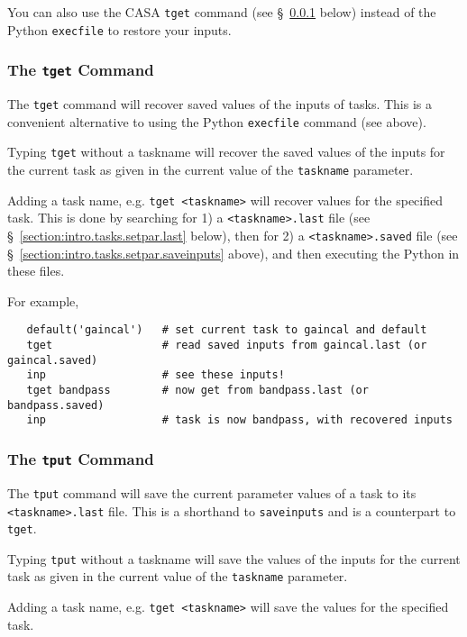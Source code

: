 You can also use the CASA {\tt tget} command (see
\S~\ref{section:intro.tasks.setpar.tget} below) instead of the Python
{\tt execfile} to restore your inputs.

\subsubsection{The {\tt tget} Command}
\label{section:intro.tasks.setpar.tget}

The {\tt tget} command will recover saved values of the
inputs of tasks.  This is a convenient alternative to using the
Python {\tt execfile} command (see above).

Typing {\tt tget} without a taskname will recover the saved values of the
inputs for the current task as given in the current value of the 
{\tt taskname} parameter.

Adding a task name, e.g. {\tt tget <taskname>} will recover
values for the specified task.  This is done by searching for
1) a {\tt <taskname>.last} file (see 
\S~\ref{section:intro.tasks.setpar.last} below), then for
2) a {\tt <taskname>.saved} file (see
\S~\ref{section:intro.tasks.setpar.saveinputs} above), and then
executing the Python in these files.

For example,
\small
\begin{verbatim}
   default('gaincal')   # set current task to gaincal and default
   tget                 # read saved inputs from gaincal.last (or gaincal.saved)
   inp                  # see these inputs!
   tget bandpass        # now get from bandpass.last (or bandpass.saved)
   inp                  # task is now bandpass, with recovered inputs
\end{verbatim}
\normalsize

\subsubsection{The {\tt tput} Command}
\label{section:intro.tasks.setpar.tput}

The {\tt tput} command will save the current parameter values of a
task to its {\tt <taskname>.last} file.  This is a shorthand to
{\tt saveinputs} and is a counterpart to {\tt tget}.

Typing {\tt tput} without a taskname will save the values of the
inputs for the current task as given in the current value of the 
{\tt taskname} parameter.

Adding a task name, e.g. {\tt tget <taskname>} will save the
values for the specified task.

